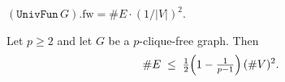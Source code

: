 \begin{lemma}
  \label{lem:UnivFun_weight}
  \leanok
  $(\texttt{UnivFun}\,G).\mathrm{fw}=\#E\cdot(1/|V|)^2$.
\end{lemma}

\begin{theorem}
  \label{thm:turans}
  \leanok
  Let $p\ge 2$ and let $G$ be a $p$-clique-free graph. Then
  \[
    \#E \;\le\; \tfrac12\Bigl(1-\tfrac1{p-1}\Bigr)\,(\#V)^2.
  \]
\end{theorem}